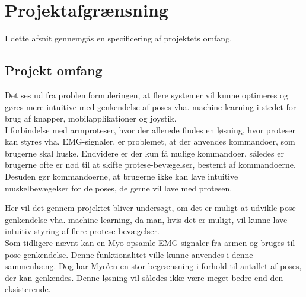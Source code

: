 \thispagestyle{fancy}
\chapter{Projektafgrænsning}
\label{chp:projektafgraensning}
I dette afsnit gennemgås en specificering af projektets omfang. %
\section{Projekt omfang}
Det ses ud fra problemformuleringen, at flere systemer vil kunne optimeres og gøres mere intuitive med genkendelse af poses vha. machine learning i stedet for brug af knapper, mobilapplikationer og joystik. \\

I forbindelse med armproteser, hvor der allerede findes en løsning, hvor proteser kan styres vha. EMG-signaler, er problemet, at der anvendes kommandoer, som brugerne skal huske. Endvidere er der kun få mulige kommandoer, således er brugerne ofte er nød til at skifte protese-bevægelser, bestemt af kommandoerne. Desuden gør kommandoerne, at brugerne ikke kan lave intuitive muskelbevægelser for de poses, de gerne vil lave med protesen. 

Her vil det gennem projektet bliver undersøgt, om det er muligt at udvikle pose genkendelse vha. machine learning, da man, hvis det er muligt, vil kunne lave intuitiv styring af flere protese-bevægelser. \\
Som tidligere nævnt kan en Myo opsamle EMG-signaler fra armen og bruges til pose-genkendelse. Denne funktionalitet ville kunne anvendes i denne sammenhæng. Dog har Myo'en en stor begrænsning i forhold til antallet af poses, der kan genkendes. Denne løsning vil således ikke være meget bedre end den eksisterende.\\


